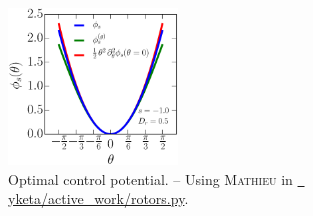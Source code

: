 \documentclass[pre,aps,superscriptaddress,nofootinbib]{revtex4}
\begin{document}
\begin{figure}[H]
\centering
\includegraphics[width=0.40\textwidth]{mathieu_potential.eps}
\caption{Optimal control potential. -- Using \textsc{Mathieu} in \href{https://github.com/yketa/active_work/blob/master/rotors.py}{\faGithub~ yketa/active\_work/rotors.py}.}
\label{mathieu_potential_fig}
\end{figure}


{\renewcommand{\bibname}{References}}
\end{document}
